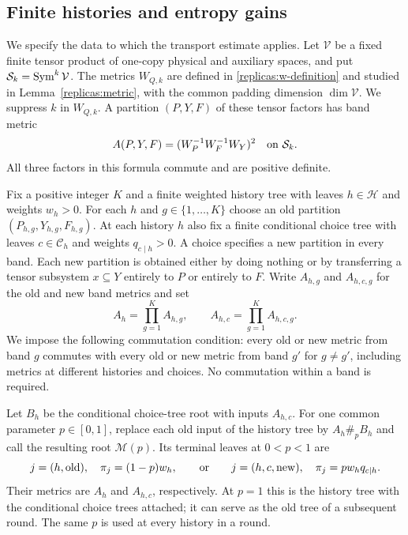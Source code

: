\subsection{Finite histories and entropy gains}

We specify the data to which the transport estimate applies.  Let
$\mathcal V$ be a fixed finite tensor product of one-copy physical and
auxiliary spaces, and put $\mathcal S_k=\operatorname{Sym}^k\mathcal V$.  The metrics
$W_{Q,k}$ are defined in \eqref{replicas:w-definition} and studied in
Lemma~\ref{replicas:metric}, with the common padding dimension
$\dim\mathcal V$.  We suppress $k$ in $W_{Q,k}$.  A partition
$(P,Y,F)$ of these tensor factors has band metric
\begin{equation}\label{transport:band-metric}
 A(P,Y,F)=(W_P^{-1}W_F^{-1}W_Y)^2
 \quad\hbox{on }\mathcal S_k.
\end{equation}
All three factors in this formula commute and are positive definite.

Fix a positive integer $K$ and a finite weighted history tree with leaves
$h\in\mathcal H$ and weights $w_h>0$.  For each $h$ and
$g\in\{1,\ldots,K\}$ choose an old partition
$(P_{h,g},Y_{h,g},F_{h,g})$.  At each history $h$ also fix a finite
conditional choice tree with leaves $c\in\mathcal C_h$ and weights
$q_{c\mid h}>0$.  A choice specifies a new partition in every band.
Each new partition is obtained either by doing nothing or by transferring
a tensor subsystem $x\subseteq Y$ entirely to $P$ or entirely to $F$.
Write $A_{h,g}$ and $A_{h,c,g}$ for the old and new band metrics and set
\[
 A_h=\prod_{g=1}^K A_{h,g},\qquad
 A_{h,c}=\prod_{g=1}^K A_{h,c,g}.
\]
We impose the following commutation condition: every old or new metric
from band $g$ commutes with every old or new metric from band $g'$ for
$g\ne g'$, including metrics at different histories and choices.
No commutation within a band is required.

Let $B_h$ be the conditional choice-tree root with inputs $A_{h,c}$.
For one common parameter $p\in[0,1]$, replace each old input of the
history tree by $A_h\#_pB_h$ and call the resulting root
$\mathcal M(p)$.  Its terminal leaves at $0<p<1$ are
\begin{equation}\label{transport:terminal-weights}
 j=(h,\mathrm{old}),\quad \pi_j=(1-p)w_h,
 \qquad\hbox{or}\qquad
 j=(h,c,\mathrm{new}),\quad \pi_j=pw_hq_{c\mid h}.
\end{equation}
Their metrics are $A_h$ and $A_{h,c}$, respectively.  At $p=1$ this is
the history tree with the conditional choice trees attached; it can serve
as the old tree of a subsequent round.  The same $p$ is used at every
history in a round.

